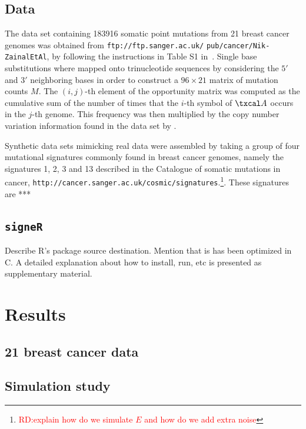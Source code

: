 \documentclass{bioinfo}
\newcommand{\CC}{C\nolinebreak\hspace{-.05em}\raisebox{.4ex}{\tiny\bf
    +}\nolinebreak\hspace{-.10em}\raisebox{.4ex}{\tiny\bf +}}
\begin{document}
\subsection{Data} The data set containing 183916 somatic point
mutations from 21 breast cancer genomes was obtained from
\verb+ftp://ftp.sanger.ac.uk/+ \verb+pub/cancer/Nik-ZainalEtAl+, by
following the instructions in Table S1 in~\cite{NCell}. Single base 
substitutions where mapped onto trinucleotide sequences by considering
the $5'$ and $3'$ neighboring bases in order to construct a $96\times
21$ matrix of mutation counts $M$. 
The $(i,j)$-th element of the opportunity matrix was computed as the
cumulative sum of the number of times that the $i$-th symbol of
$\txcal A$ occurs in the $j$-th genome. This frequency was then
multiplied by the copy number variation information found in the data 
set by \cite{NCell}.


Synthetic data sets mimicking real data were assembled by taking a
group of four mutational signatures commonly found in 
breast cancer genomes, namely the signatures 1, 2, 3 and 13 described   
in the Catalogue  of somatic  mutations in cancer,
\verb~http://cancer.sanger.ac.uk/cosmic/signatures~.\footnote{\textcolor{red}{RD:explain
    how do we simulate $E$ and how do we add extra noise}}. These
signatures are ***


\subsection{\texttt{signeR}} Describe R's package 
source destination. Mention that is has been optimized in
\CC. A detailed explanation about how to install, run, etc is
presented as supplementary material.

\section{Results}
\subsection{21 breast cancer data}
\subsection{Simulation study}
\end{document}
